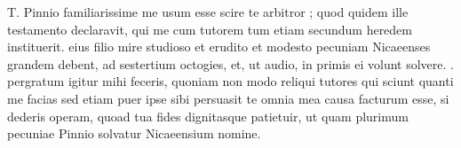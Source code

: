 


T. Pinnio familiarissime me usum esse scire te arbitror ; quod quidem ille testamento declaravit, qui me cum tutorem tum etiam secundum heredem instituerit. eius filio mire studioso et erudito et modesto pecuniam Nicaeenses grandem debent, ad sestertium octogies, et, ut audio, in primis ei volunt solvere. . pergratum igitur mihi feceris, quoniam non modo reliqui tutores qui sciunt quanti me facias sed etiam puer ipse sibi persuasit te omnia mea causa facturum
esse, si dederis operam, quoad tua fides dignitasque patietuir, ut quam plurimum pecuniae Pinnio solvatur Nicaeensium nomine.
